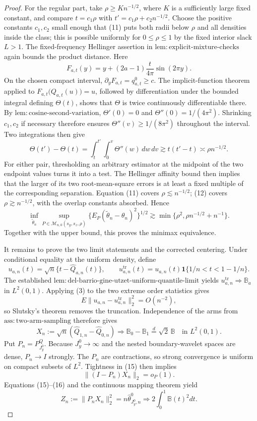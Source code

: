 \documentclass{article}
\begin{document}
\begin{proof}
For the regular part, take \(\rho\ge K n^{-1/2}\), where \(K\) is a sufficiently large fixed constant, and compare \(t=c_1\rho\) with \(t'=c_1\rho+c_2n^{-1/2}\). Choose the positive constants \(c_1,c_2\) small enough that (11) puts both radii below \(\rho\) and all densities inside the class; this is possible uniformly for \(0\le\rho\le1\) by the fixed interior slack \(L>1\). The fixed-frequency Hellinger assertion in \(\mathrm{lem{:}explicit\text{-}mixture\text{-}checks}\) again bounds the product distance. Here
\[
F_{a,t}(y)=y+(2a-1)\frac{t}{4\pi}\sin(2\pi y).
\]
On the chosen compact interval, \(\partial_yF_{a,t}=q_{a,t}^0\ge c\). The implicit-function theorem applied to \(F_{a,t}\bigl(Q_{a,t}(u)\bigr)=u\), followed by differentiation under the bounded integral defining \(\Theta(t)\), shows that \(\Theta\) is twice continuously differentiable there. By \(\mathrm{lem{:}cosine\text{-}second\text{-}variation}\), \(\Theta'(0)=0\) and \(\Theta''(0)=1/(4\pi^2)\). Shrinking \(c_1,c_2\) if necessary therefore ensures \(\Theta''(v)\ge1/(8\pi^2)\) throughout the interval. Two integrations then give
\[
\Theta(t')-\Theta(t)
=\int_t^{t'}\int_0^v\Theta''(w)\,dw\,dv
\gtrsim t(t'-t)
\asymp\rho n^{-1/2}. \tag{12}
\]
For either pair, thresholding an arbitrary estimator at the midpoint of the two endpoint values turns it into a test. The Hellinger affinity bound then implies that the larger of its two root-mean-square errors is at least a fixed multiple of the corresponding separation. Equation (11) covers \(\rho\lesssim n^{-1/2}\); (12) covers \(\rho\gtrsim n^{-1/2}\), with the overlap constants absorbed. Hence
\[
\inf_{\widetilde\theta_n}\sup_{P\in\mathcal M_{n,0}(s_y,s_z,\rho)}
\{E_P(\widetilde\theta_n-\theta_n)^2\}^{1/2}
\gtrsim\min\{\rho^2,\rho n^{-1/2}+n^{-1}\}. \tag{13}
\]
Together with the upper bound, this proves the minimax equivalence.

It remains to prove the two limit statements and the corrected centering. Under conditional equality at the uniform density, define
\[
u_{a,n}(t)=\sqrt n\{t-\widehat Q_{a,n}(t)\},
\qquad
u_{a,n}^{\mathrm{tr}}(t)=u_{a,n}(t)\mathbf1\{1/n<t<1-1/n\}.
\]
The established \(\mathrm{lem{:}del\text{-}barrio\text{-}gine\text{-}utzet\text{-}uniform\text{-}quantile\text{-}limit}\) yields \(u_{a,n}^{\mathrm{tr}}\Rightarrow\mathbb B_a\) in \(L^2(0,1)\). Applying (3) to the two extreme order statistics gives
\[
E\|u_{a,n}-u_{a,n}^{\mathrm{tr}}\|_2^2=O(n^{-2}), \tag{14}
\]
so Slutsky's theorem removes the truncation. Independence of the arms from \(\mathrm{ass{:}two\text{-}arm\text{-}sampling}\) therefore gives
\[
X_n:=\sqrt n(\widehat Q_{1,n}-\widehat Q_{0,n})
\Rightarrow\mathbb B_0-\mathbb B_1\stackrel d=\sqrt2\,\mathbb B
\quad\text{in }L^2(0,1). \tag{15}
\]
Put \(P_n=P^Q_{J_y^0}\). Because \(J_y^0\to\infty\) and the nested boundary-wavelet spaces are dense, \(P_n\to I\) strongly. The \(P_n\) are contractions, so strong convergence is uniform on compact subsets of \(L^2\). Tightness in (15) then implies
\[
\|(I-P_n)X_n\|_2=o_P(1). \tag{16}
\]
Equations (15)--(16) and the continuous mapping theorem yield
\[
Z_n:=\|P_nX_n\|_2^2=n\widehat\theta^0_{J_y^0,n}
\Rightarrow2\int_0^1\mathbb B(t)^2dt. \tag{17}
\]


\end{proof}
\end{document}
